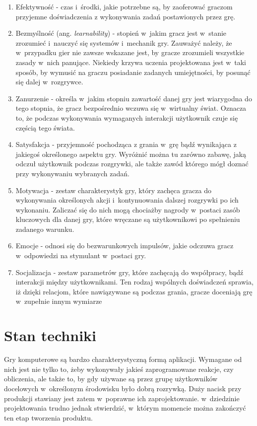 \documentclass[a4paper,12pt,numbers=noenddot]{report}
\begin{document}
\begin{enumerate}
\item Efektywność - czas i~środki, jakie potrzebne są, by zaoferować graczom przyjemne doświadczenia z wykonywania zadań postawionych przez grę.
\item Bezmyślność (ang. \textit{learnability}) - stopień w~jakim gracz jest w~stanie zrozumieć i~nauczyć się systemów i~mechanik gry. Zauważyć należy, że w~przypadku gier nie zawsze wskazane jest, by gracze zrozumieli wszystkie zasady w~nich panujące. Niekiedy krzywa uczenia projektowana jest w~taki sposób, by wymusić na graczu posiadanie zadanych umiejętności, by posunąć się dalej w~rozgrywce.
\item Zanurzenie - określa w~jakim stopniu zawartość danej gry jest wiarygodna do tego stopnia, że gracz bezpośrednio wczuwa się w~wirtualny świat. Oznacza to, że podczas wykonywania wymaganych interakcji użytkownik czuje się częścią tego świata.
\item Satysfakcja - przyjemność pochodząca z grania w~grę bądź wynikająca z jakiegoś określonego aspektu gry. Wyróżnić można tu zarówno zabawę, jaką odczuł użytkownik podczas rozgrywki, ale także zawód którego mógł doznać przy wykonywaniu wybranych zadań.
\item Motywacja - zestaw charakterystyk gry, który zachęca gracza do wykonywania określonych akcji i~kontynuowania dalszej rozgrywki po ich wykonaniu. Zaliczać się do nich mogą chociażby nagrody w~postaci zasób kluczowych dla danej gry, które wręczane są użytkownikowi po spełnieniu zadanego warunku.
\item Emocje - odnosi się do bezwarunkowych impulsów, jakie odczuwa gracz w~odpowiedzi na stymulant w~postaci gry.
\item Socjalizacja - zestaw parametrów gry, które zachęcają do współpracy, bądź interakcji między użytkownikami. Ten rodzaj wspólnych doświadczeń sprawia, iż dzięki relacjom, które nawiązywane są podczas grania, gracze doceniają grę w~zupełnie innym wymiarze 
\end{enumerate}


\chapter{Stan techniki}
Gry komputerowe są bardzo charakterystyczną formą aplikacji. Wymagane od nich jest nie tylko to, żeby wykonywały jakieś zaprogramowane reakcje, czy obliczenia, ale także to, by gdy używane są przez grupę użytkowników docelowych w~określonym środowisku było dobrą rozrywką. Duży nacisk przy produkcji stawiany jest zatem w~poprawne ich zaprojektowanie. w~dziedzinie projektowania trudno jednak stwierdzić, w~którym momencie można zakończyć ten etap tworzenia produktu. 
\end{document}
